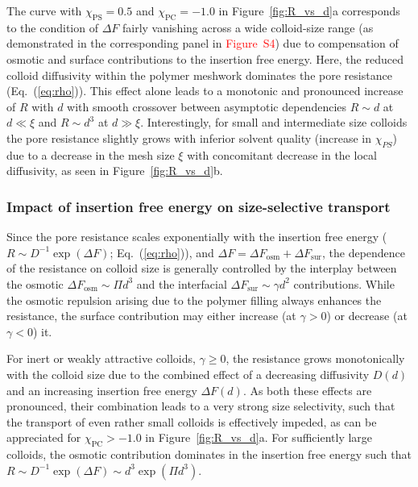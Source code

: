 \documentclass[12pt, a4paper]{article}
\newcommand\todo[1]{\textcolor{red}{#1}}
\begin{document}
The curve with $\chi_{\text{PS}}=0.5$ and $\chi_{\text{PC}} = -1.0$ in Figure~\ref{fig:R_vs_d}a corresponds to the condition of $\Delta F$ fairly vanishing across a wide colloid-size range (as demonstrated in the corresponding panel in \todo{Figure~S4}) due to compensation of osmotic and surface contributions to the insertion free energy.
Here, the reduced colloid diffusivity within the polymer meshwork dominates the pore resistance (Eq.~(\ref{eq:rho})). 
This effect alone leads to a monotonic and pronounced increase of $R$ with $d$ with smooth crossover between asymptotic dependencies $R\sim d$ at $d\ll \xi$ and $R\sim d^3$ at $d\gg \xi$. 
Interestingly, for small and intermediate size colloids the pore resistance slightly grows with inferior solvent quality (increase in $\chi_{PS}$) due to a decrease in the mesh size $\xi$ with concomitant decrease in the local diffusivity, as seen in Figure~\ref{fig:R_vs_d}b.


\subsubsection{Impact of insertion free energy on size-selective transport}

Since the pore resistance scales exponentially with the insertion free energy ($R \sim D^{-1}\exp (\Delta F)$; Eq.~(\ref{eq:rho})), and $\Delta F =\Delta F_{\text{osm}} + \Delta F_{\text{sur}}$, the dependence of the resistance on colloid size is generally controlled by the interplay between
the osmotic $\Delta F_{\text{osm}} \sim \Pi d^3$ and the interfacial $\Delta F_{\text{sur}} \sim \gamma d^2$ contributions. 
While the osmotic repulsion arising due to the polymer filling always enhances the resistance, the surface contribution may either increase (at $\gamma > 0$) or decrease (at $\gamma<0$) it.

For inert or weakly attractive colloids, $\gamma \geq 0$, the resistance grows monotonically with the colloid size due to the combined effect of a decreasing diffusivity $D(d)$ and an increasing insertion free energy  $\Delta F(d)$.
As both these effects are pronounced, their combination leads to a very strong size selectivity, such that the transport of even rather small colloids is effectively impeded, as can be appreciated for $\chi_{\text{PC}} > -1.0$ in Figure~\ref{fig:R_vs_d}a.
For sufficiently large colloids, the osmotic contribution dominates in the insertion free energy such that $R \sim D^{-1} \exp (\Delta F) \sim d^3 \exp (\Pi d^3)$.
\end{document}
